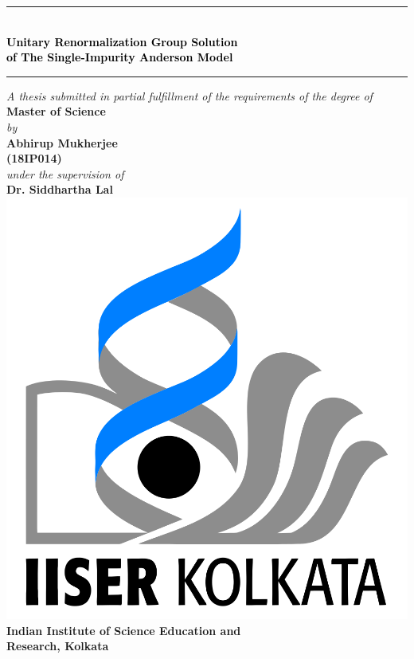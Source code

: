 \documentclass[twoside]{report}
\numberwithin{equation}{section}
\begin{document}
\begin{titlepage}
	\centering
	\rule{\textwidth}{3pt}\\
	\vspace*{25pt}
	\textcolor{black}{ %
		\textbf{\LARGE Unitary Renormalization Group Solution}\\[10pt]
		\textbf{\LARGE of The Single-Impurity Anderson Model}
	\vspace*{25pt}
	}
	\rule{\textwidth}{3pt} %
	\vfill
{
	\textit{\large A thesis submitted in partial fulfillment of the requirements of the degree of }\\
	\vspace*{15pt}
	{\Large \textbf{Master of Science\\}}
	\vspace*{15pt}
	\textit{\large by \\}
	\vspace*{15pt}
	{\Large \textbf{Abhirup Mukherjee \\}}
	\vspace*{5pt}
	{\Large \textbf{(18IP014)\\}}
	\vspace*{15pt}
	\textit{\large under the supervision of \\}
	\vspace*{15pt}
	{\Large \textbf{Dr. Siddhartha Lal}}
}
	\vfill
	\includegraphics[scale=0.15]{../figures/logo.png}\\
	\vspace{0.01\textheight}
	\textbf{\Large Indian Institute of Science Education and \\[10pt]}
\textbf{\Large Research, Kolkata}
\end{titlepage}
\end{document}
